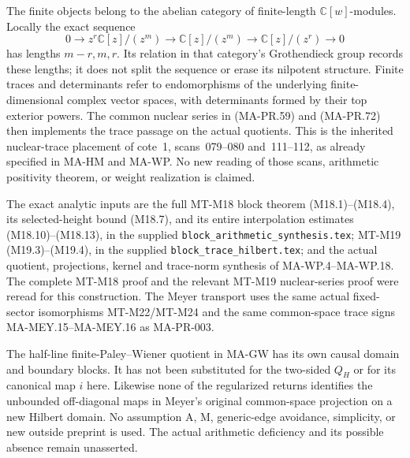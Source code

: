 The finite objects belong to the abelian category of
finite-length \(\mathbb C[w]\)-modules.
Locally the exact sequence
\[
 0\longrightarrow z^r\mathbb C[z]/(z^m)
   \longrightarrow\mathbb C[z]/(z^m)
   \longrightarrow\mathbb C[z]/(z^r)
   \longrightarrow0
 \tag{MA-PR.80}
\]
has lengths \(m-r,m,r\).  Its relation in that category's
Grothendieck group records these lengths; it does not
split the sequence or erase its nilpotent structure.
Finite traces and determinants refer to endomorphisms
of the underlying finite-dimensional complex vector spaces,
with determinants formed by their top exterior powers.
The common nuclear series in (MA-PR.59) and (MA-PR.72)
then implements the trace passage on the actual quotients.
This is the inherited nuclear-trace placement of
cote~1, scans~079--080 and~111--112, as already specified
in MA-HM and MA-WP.  No new reading of those scans,
arithmetic positivity theorem, or weight realization
is claimed.

The exact analytic inputs are the full MT-M18
block theorem (M18.1)--(M18.4), its selected-height
bound (M18.7), and its entire interpolation estimates
(M18.10)--(M18.13), in the supplied
\texttt{block\_arithmetic\_synthesis.tex};
MT-M19 (M19.3)--(M19.4), in the supplied
\texttt{block\_trace\_hilbert.tex};
and the actual quotient, projections, kernel and
trace-norm synthesis of MA-WP.4--MA-WP.18.
The complete MT-M18 proof and the relevant MT-M19
nuclear-series proof were reread for this construction.
The Meyer transport uses the same actual fixed-sector
isomorphisms MT-M22/MT-M24 and the same common-space
trace signs MA-MEY.15--MA-MEY.16 as MA-PR-003.

The half-line finite-Paley--Wiener quotient in MA-GW
has its own causal domain and boundary blocks.
It has not been substituted for the two-sided
\(Q_H\) or for its canonical map \(i\) here.
Likewise none of the regularized returns identifies
the unbounded off-diagonal maps in Meyer's original
common-space projection on a new Hilbert domain.
No assumption A, M, generic-edge avoidance, simplicity,
or new outside preprint is used.  The actual arithmetic
deficiency and its possible absence remain unasserted.
